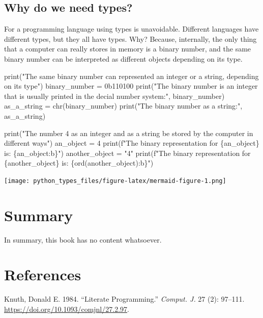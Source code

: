 \documentclass[
  letterpaper,
  DIV=11,
  numbers=noendperiod]{scrreprt}
\newenvironment{Shaded}{\begin{snugshade}}{\end{snugshade}}
\newcommand{\NormalTok}[1]{\textcolor[rgb]{0.00,0.23,0.31}{#1}}
\newlength{\cslhangindent}
\newenvironment{CSLReferences}[2] %
 {\begin{list}{}{%
  \setlength{\itemindent}{0pt}
  \setlength{\leftmargin}{0pt}
  \setlength{\parsep}{0pt}
  \ifodd #1
   \setlength{\leftmargin}{\cslhangindent}
   \setlength{\itemindent}{-1\cslhangindent}
  \fi
  \setlength{\itemsep}{#2\baselineskip}}}
 {\end{list}}
\theoremstyle{remark}
\begin{document}
\section{Why do we need types?}\label{why-do-we-need-types}

For a programming language using types is unavoidable. Different
languages have different types, but they all have types. Why? Because,
internally, the only thing that a computer can really stores in memory
is a binary number, and the same binary number can be interpreted as
different objects depending on its type.

\begin{Shaded}
\begin{Highlighting}[]
\NormalTok{print("The same binary number can represented an integer or a string, depending on its type")}
\NormalTok{binary\_number = 0b110100}
\NormalTok{print("The binary number is an integer that is usually printed in the decial number system:", binary\_number)}
\NormalTok{as\_a\_string = chr(binary\_number)}
\NormalTok{print("The binary number as a string:", as\_a\_string)}

\NormalTok{print("The number 4 as an integer and as a string be stored by the computer in different ways")}
\NormalTok{an\_object = 4}
\NormalTok{print(f"The binary representation for \{an\_object\} is: \{an\_object:b\}")}
\NormalTok{another\_object = "4"}
\NormalTok{print(f"The binary representation for \{another\_object\} is: \{ord(another\_object):b\}")}
\end{Highlighting}
\end{Shaded}

\texttt{[image: python\_types\_files/figure-latex/mermaid-figure-1.png]}


\chapter{Summary}\label{summary}

In summary, this book has no content whatsoever.


\chapter*{References}\label{references}


\label{refs}
\begin{CSLReferences}{1}{0}
Knuth, Donald E. 1984. {``Literate Programming.''} \emph{Comput. J.} 27
(2): 97--111. \url{https://doi.org/10.1093/comjnl/27.2.97}.

\end{CSLReferences}
\end{document}

